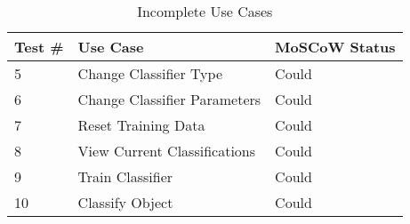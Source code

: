 \begin{table}[h]
\centering
\small
\begin{tabular}{lll}
\hline
\textbf{Test \#} & \textbf{Use Case} & \textbf{MoSCoW Status} \\ \hline
5              & Change Classifier Type       & Could            \\ 
6              & Change Classifier Parameters & Could            \\ 
7              & Reset Training Data          & Could            \\ 
8              & View Current Classifications & Could            \\ 
9              & Train Classifier             & Could            \\ 
10             & Classify Object              & Could            \\ \hline
\end{tabular}
\caption{Incomplete Use Cases \protect {\label{tab:incomplete}}}
\end{table}